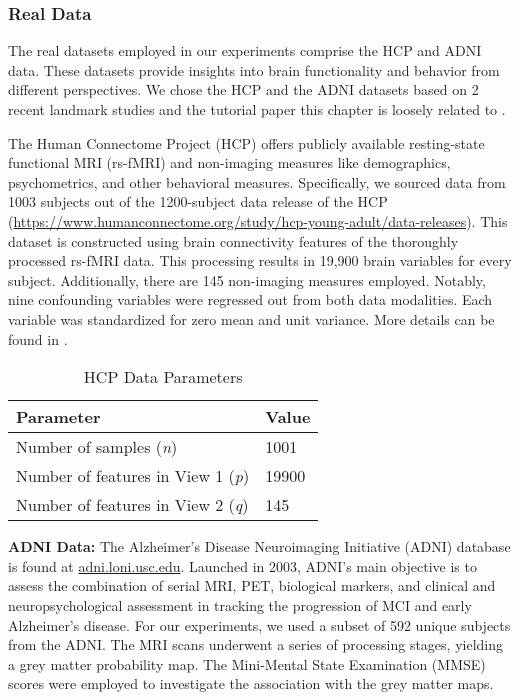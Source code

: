 \subsubsection{Real Data}

The real datasets employed in our experiments comprise the HCP and ADNI data. These datasets provide insights into brain functionality and behavior from different perspectives.
We chose the HCP and the ADNI datasets based on 2
recent landmark studies and the tutorial paper this chapter is loosely related to \cite{mihalik2022canonical}. 


The Human Connectome Project (HCP) offers publicly available resting-state functional MRI (rs-fMRI) and non-imaging
measures like demographics, psychometrics, and other behavioral measures.
Specifically, we sourced data from 1003
subjects out of the 1200-subject data release of the HCP (\url{https://www.humanconnectome.org/study/hcp-young-adult/data-releases}). This dataset is constructed using brain connectivity features of the thoroughly processed rs-fMRI data. This processing results in 19,900 brain variables for every subject. Additionally, there are 145 non-imaging measures employed. Notably, nine confounding variables were regressed out from both data modalities. Each variable was standardized for zero mean and unit variance. More details can be found in \cite{smith2015positive, mihalik2022canonical}.

\begin{table}[h]
\centering
\caption{HCP Data Parameters}
\begin{tabular}{| l | l |}
\hline
\textbf{Parameter} & \textbf{Value} \\
\hline
Number of samples (\textit{n}) & 1001 \\
Number of features in View 1 (\textit{p}) & 19900 \\
Number of features in View 2 (\textit{q}) & 145 \\
\hline
\end{tabular}
\label{table:hcp-parameters}
\end{table}

\textbf{ADNI Data:}
The Alzheimer’s Disease Neuroimaging Initiative (ADNI) database is found at \url{adni.loni.usc.edu}.
Launched in 2003, ADNI's main objective is to assess the combination of serial MRI, PET, biological markers, and clinical and neuropsychological assessment in tracking the progression of MCI and early Alzheimer’s disease.
For our experiments, we used a subset of 592 unique subjects from the ADNI. The MRI scans underwent a series of processing stages, yielding a grey matter probability map.
The Mini-Mental State Examination (MMSE) scores were employed to investigate the association with the grey matter maps.

